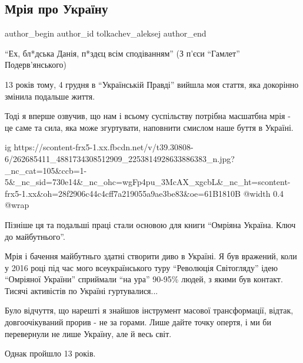  
 
 
 
 
 
\subsection{Мрія про Україну}
\label{sec:04_12_2021.fb.tolkachev_aleksej.1.mria_pro_ukrainu}
 
\ifcmt
 author_begin
   author_id tolkachev_aleksej
 author_end
\fi

\enquote{Ех, бл*дська Данія, п*здєц всім сподіванням} (З п'єси \enquote{Гамлет} Подерв'янського)

13 років тому, 4 грудня в \enquote{Українській Правді} вийшла моя стаття, яка
докорінно змінила подальше життя.

Тоді я вперше озвучив, що нам і всьому суспільству потрібна масшатбна мрія - це
саме та сила, яка може згуртувати, наповнити смислом наше буття в Україні. 

\ifcmt
  ig https://scontent-frx5-1.xx.fbcdn.net/v/t39.30808-6/262685411_4881734308512909_2253814928633886383_n.jpg?_nc_cat=105&ccb=1-5&_nc_sid=730e14&_nc_ohc=wgFp4pu_3McAX_xgcbL&_nc_ht=scontent-frx5-1.xx&oh=28f2906c44c4cff7a219055a9ae3be83&oe=61B1810B
  @width 0.4
  @wrap 
\fi

Пізніше ця та подальші праці стали основою для книги \enquote{Омріяна Україна.
Ключ до майбутнього}.

Мрія і бачення майбутньго здатні створити диво в Україні. Я був вражений, коли
у 2016 році під час мого всеукраїнського туру \enquote{Революція Світогляду}
ідею \enquote{Омріяної України} сприймали \enquote{на ура} 90-95\% людей, з
якими був контакт. Тисячі активістів по Україні гуртувалися...

Було відчуття, що нарешті я знайшов інструмент масової трансформації, відтак,
довгоочікуваний прорив - не за горами. Лише дайте точку опертя, і ми би
перевернули не лише Україну, але й весь світ.  

Однак пройшло 13 років. 

